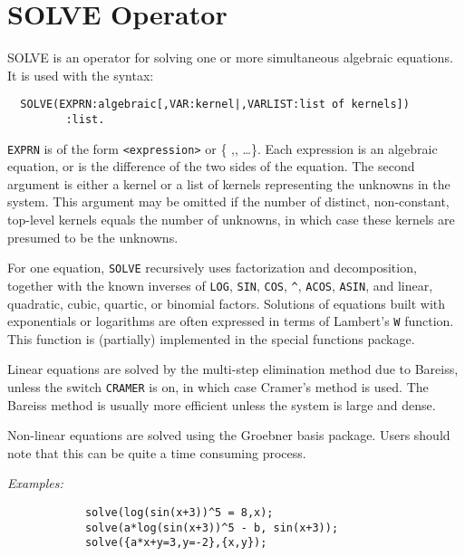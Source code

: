 \section{SOLVE Operator}
SOLVE is an operator for solving one or more simultaneous algebraic
equations. It is used with the syntax:
\begin{verbatim}
  SOLVE(EXPRN:algebraic[,VAR:kernel|,VARLIST:list of kernels])
         :list.
\end{verbatim}
{\tt EXPRN} is of the form {\tt <expression>} or
\{ {\tt <expression1>},{\tt <expression2>}, \dots \}.  Each expression is an
algebraic equation, or is the difference of the two sides of the equation.
The second argument is either a kernel or a list of kernels representing
the unknowns in the system.  This argument may be omitted if the number of
distinct, non-constant, top-level kernels equals the number of unknowns,
in which case these kernels are presumed to be the unknowns.

For one equation, {\tt SOLVE} recursively uses
factorization and decomposition, together with the known inverses of
{\tt LOG}, {\tt SIN}, {\tt COS}, {\tt \verb|^|}, {\tt ACOS}, {\tt ASIN}, and
linear, quadratic, cubic, quartic, or binomial factors. Solutions
of equations built with exponentials or logarithms are often
expressed in terms of Lambert's {\tt W} function.
This function is (partially) implemented in the special functions package.

Linear equations are solved by the multi-step elimination method due to
Bareiss, unless the switch {\tt CRAMER} is on, in which
case Cramer's method is used.  The Bareiss method is usually more
efficient unless the system is large and dense.

Non-linear equations are solved using the Groebner basis package.
 Users should note that this can be quite a
time consuming process.

{\it Examples:}
\begin{verbatim}
            solve(log(sin(x+3))^5 = 8,x);
            solve(a*log(sin(x+3))^5 - b, sin(x+3));
            solve({a*x+y=3,y=-2},{x,y});
\end{verbatim}

